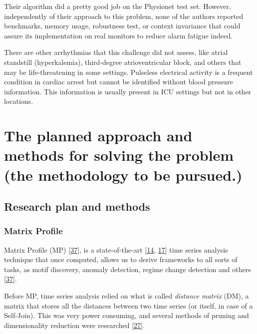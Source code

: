 \documentclass[runningheads]{llncs}
\begin{document}
Their algorithm did a pretty good job on the Physionet test set. However, independently of their approach to this
problem, none of the authors reported benchmarks, memory usage, robustness test, or context invariance that could assure
its implementation on real monitors to reduce alarm fatigue indeed.

There are other arrhythmias that this challenge did not assess, like atrial standstill (hyperkalemia), third-degree
atrioventricular block, and others that may be life-threatening in some settings. Pulseless electrical activity is a
frequent condition in cardiac arrest but cannot be identified without blood pressure information. This information is
usually present in ICU settings but not in other locations.

\hypertarget{the-planned-approach-and-methods-for-solving-the-problem-the-methodology-to-be-pursued.}{%
\section{The planned approach and methods for solving the problem (the methodology to be pursued.)}\label{the-planned-approach-and-methods-for-solving-the-problem-the-methodology-to-be-pursued.}}

\hypertarget{research-plan-and-methods}{%
\subsection{Research plan and methods}\label{research-plan-and-methods}}

\hypertarget{matrixprofile}{%
\subsubsection{Matrix Profile}\label{matrixprofile}}

Matrix Profile (MP) {[}\protect\hyperlink{ref-Yeh2017a}{37}{]}, is a state-of-the-art {[}\protect\hyperlink{ref-DePaepe2020}{14}, \protect\hyperlink{ref-Feremans2020}{17}{]} time series
analysis technique that once computed, allows us to derive frameworks to all sorts of tasks, as
motif discovery, anomaly detection, regime change detection and others {[}\protect\hyperlink{ref-Yeh2017a}{37}{]}.

Before MP, time series analysis relied on what is called \emph{distance matrix} (DM), a matrix that stores all
the distances between two time series (or itself, in case of a Self-Join). This was very power consuming,
and several methods of pruning and dimensionality reduction were researched {[}\protect\hyperlink{ref-Lin2007}{27}{]}.
\end{document}

